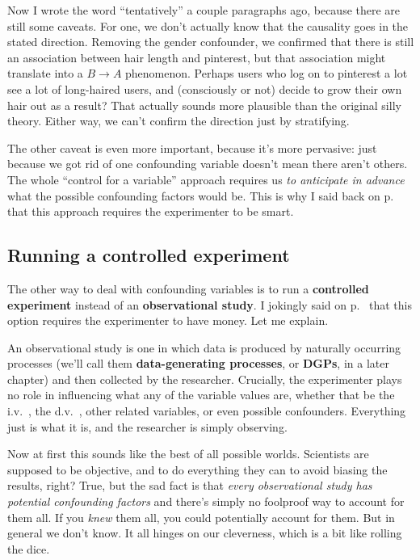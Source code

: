 
Now I wrote the word ``tentatively'' a couple paragraphs ago, because there are
still some caveats. For one, we don't actually know that the causality goes in
the stated direction. Removing the gender confounder, we confirmed that there
is still an association between hair length and pinterest, but that association
might translate into a $B \rightarrow A$ phenomenon. Perhaps users who log on
to pinterest a lot see a lot of long-haired users, and (consciously or not)
decide to grow their own hair out as a result? That actually sounds more
plausible than the original silly theory. Either way, we can't confirm the
direction just by stratifying.

The other caveat is even more important, because it's more pervasive: just
because we got rid of one confounding variable doesn't mean there aren't
others. The whole ``control for a variable'' approach requires us \textit{to
anticipate in advance} what the possible confounding factors would be. This is
why I said back on p.~\pageref{smart} that this approach requires the
experimenter to be smart.

\subsection{Running a controlled experiment}


The other way to deal with confounding variables is to run a \textbf{controlled
experiment} instead of an \textbf{observational study}. I jokingly said on
p.~\pageref{smart} that this option requires the experimenter to have money.
Let me explain.


An observational study is one in which data is produced by naturally occurring
processes (we'll call them \textbf{data-generating processes}, or
\textbf{DGPs}, in a later chapter) and then collected by the researcher.
Crucially, the experimenter plays no role in influencing what any of the
variable values are, whether that be the i.v.~, the d.v.~, other related
variables, or even possible confounders. Everything just is what it is, and the
researcher is simply observing.

Now at first this sounds like the best of all possible worlds. Scientists are
supposed to be objective, and to do everything they can to avoid biasing the
results, right? True, but the sad fact is that \textit{every observational
study has potential confounding factors} and there's simply no foolproof way to
account for them all. If you \textit{knew} them all, you could potentially
account for them. But in general we don't know. It all hinges on our
cleverness, which is a bit like rolling the dice.

